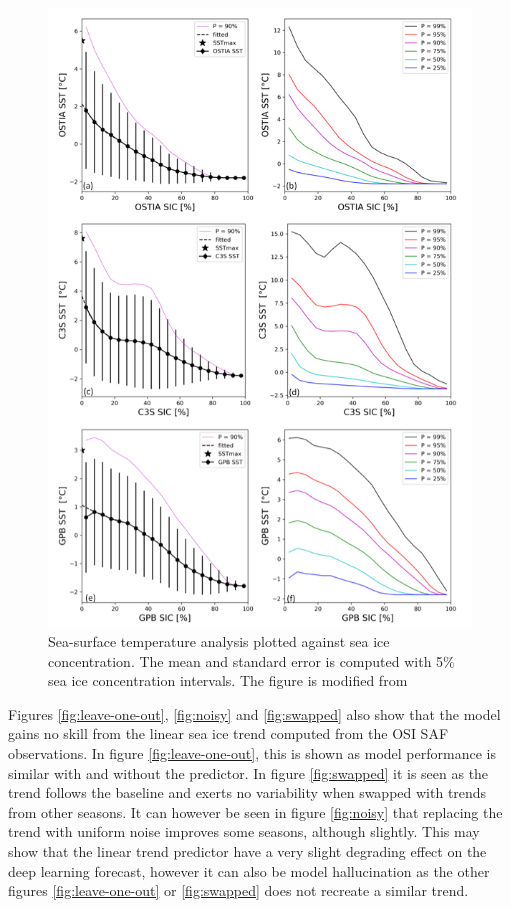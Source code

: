\documentclass[../main/thesis]{subfiles}
\begin{document}
\begin{figure}[h]
    \centering
    \includegraphics[trim={0 20cm 10.7cm 0}, clip]{EastwoodSST}
    \caption{\label{fig:sst-uncertain}Sea-surface temperature analysis plotted against sea ice concentration. The mean and standard error is computed with 5\% sea ice concentration intervals. The figure is modified from \protect\citet{Castro2023}}
\end{figure}

Figures \ref{fig:leave-one-out}, \ref{fig:noisy} and \ref{fig:swapped} also show that the model gains no skill from the linear sea ice trend computed from the OSI SAF observations. In figure \ref{fig:leave-one-out}, this is shown as model performance is similar with and without the predictor. In figure \ref{fig:swapped} it is seen as the trend follows the baseline and exerts no variability when swapped with trends from other seasons. It can however be seen in figure \ref{fig:noisy} that replacing the trend with uniform noise improves some seasons, although slightly. This may show that the linear trend predictor have a very slight degrading effect on the deep learning forecast, however it can also be model hallucination as the other figures \ref{fig:leave-one-out} or \ref{fig:swapped} does not recreate a similar trend.
\end{document}
